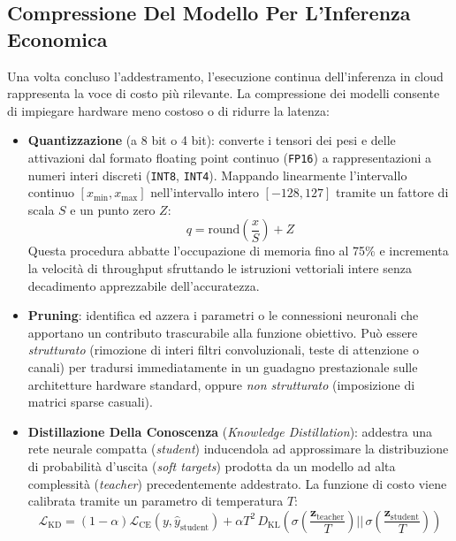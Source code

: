 \documentclass[11pt, a4paper]{article}
\begin{document}
\subsection{Compressione Del Modello Per L'Inferenza Economica}

Una volta concluso l'addestramento, l'esecuzione continua dell'inferenza in cloud rappresenta la voce di costo più rilevante. La compressione dei modelli consente di impiegare hardware meno costoso o di ridurre la latenza:
\begin{itemize}
    \item \textbf{Quantizzazione} (a 8 bit o 4 bit): converte i tensori dei pesi e delle attivazioni dal formato floating point continuo (\texttt{FP16}) a rappresentazioni a numeri interi discreti (\texttt{INT8}, \texttt{INT4}). Mappando linearmente l'intervallo continuo $[x_{\min}, x_{\max}]$ nell'intervallo intero $[-128, 127]$ tramite un fattore di scala $S$ e un punto zero $Z$:
    \begin{equation}
        q = \text{round}\left( \frac{x}{S} \right) + Z
    \end{equation}
    Questa procedura abbatte l'occupazione di memoria fino al 75\% e incrementa la velocità di throughput sfruttando le istruzioni vettoriali intere senza decadimento apprezzabile dell'accuratezza.
    \item \textbf{Pruning}: identifica ed azzera i parametri o le connessioni neuronali che apportano un contributo trascurabile alla funzione obiettivo. Può essere \emph{strutturato} (rimozione di interi filtri convoluzionali, teste di attenzione o canali) per tradursi immediatamente in un guadagno prestazionale sulle architetture hardware standard, oppure \emph{non strutturato} (imposizione di matrici sparse casuali).
    \item \textbf{Distillazione Della Conoscenza} (\emph{Knowledge Distillation}): addestra una rete neurale compatta (\emph{student}) inducendola ad approssimare la distribuzione di probabilità d'uscita (\emph{soft targets}) prodotta da un modello ad alta complessità (\emph{teacher}) precedentemente addestrato. La funzione di costo viene calibrata tramite un parametro di temperatura $T$:
    \begin{equation}
        \mathcal{L}_{\text{KD}} = (1 - \alpha) \mathcal{L}_{\text{CE}}(y, \hat{y}_{\text{student}}) + \alpha T^2 \, D_{\text{KL}}\!\left( \sigma\left(\frac{\bm{z}_{\text{teacher}}}{T}\right) \Bigg|\Bigg| \, \sigma\left(\frac{\bm{z}_{\text{student}}}{T}\right) \right)
    \end{equation}

\end{itemize}
\end{document}

